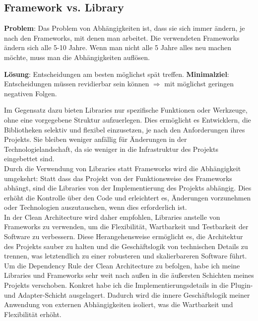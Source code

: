\subsection{Framework vs. Library}
\textbf{Problem}:
Das Problem von Abhängigkeiten ist, dass sie sich immer ändern, je nach den Frameworks, mit denen man arbeitet. Die verwendeten Frameworks ändern sich alle 5-10 Jahre. Wenn man nicht alle 5 Jahre alles neu machen möchte, muss man die Abhängigkeiten auflösen.

\textbf{Lösung}:
Entscheidungen am besten möglichst spät treffen. \textbf{Minimalziel}:
Entscheidungen müssen revidierbar sein können $\Longrightarrow$ mit möglichst geringen negativen Folgen.

Im Gegensatz dazu bieten Libraries nur spezifische Funktionen oder Werkzeuge, ohne eine vorgegebene Struktur aufzuerlegen. Dies ermöglicht es Entwicklern, die Bibliotheken selektiv und flexibel einzusetzen, je nach den Anforderungen ihres Projekts. Sie bleiben weniger anfällig für Änderungen in der Technologielandschaft, da sie weniger in die Infrastruktur des Projekts eingebettet sind.\\

Durch die Verwendung von Libraries statt Frameworks wird die Abhängigkeit umgekehrt: Statt dass das Projekt von der Funktionsweise des Frameworks abhängt, sind die Libraries von der Implementierung des Projekts abhängig. Dies erhöht die Kontrolle über den Code und erleichtert es, Änderungen vorzunehmen oder Technologien auszutauschen, wenn dies erforderlich ist.\\

In der Clean Architecture wird daher empfohlen, Libraries anstelle von Frameworks zu verwenden, um die Flexibilität, Wartbarkeit und Testbarkeit der Software zu verbessern. Diese Herangehensweise ermöglicht es, die Architektur des Projekts sauber zu halten und die Geschäftslogik von technischen Details zu trennen, was letztendlich zu einer robusteren und skalierbareren Software führt.\\


Um die Dependency Rule der Clean Architecture zu befolgen, habe ich meine Libraries und Frameworks sehr weit nach außen in die äußersten Schichten meines Projekts verschoben. Konkret habe ich die Implementierungsdetails in die Plugin- und Adapter-Schicht ausgelagert. Dadurch wird die innere Geschäftslogik meiner Anwendung von externen Abhängigkeiten isoliert, was die Wartbarkeit und Flexibilität erhöht.\\

